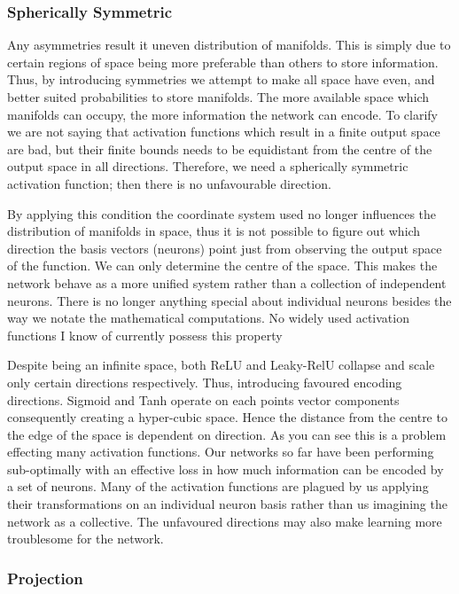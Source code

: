 \documentclass[onecolumn]{article}
\begin{document}
    \subsubsection{Spherically Symmetric}
    
    Any asymmetries result it uneven distribution of manifolds. This is simply due to certain regions of space being more preferable than others to store information. Thus, by introducing symmetries we attempt to make all space have even, and better suited probabilities to store manifolds. The more available space which manifolds can occupy, the more information the network can encode. To clarify we are not saying that activation functions which result in a finite output space are bad, but their finite bounds needs to be equidistant from the centre of the output space in all directions. Therefore, we need a spherically symmetric activation function; then there is no unfavourable direction.

    By applying this condition the coordinate system used no longer influences the distribution of manifolds in space, thus it is not possible to figure out which direction the basis vectors (neurons) point just from observing the output space of the function. We can only determine the centre of the space. This makes the network behave as a more unified system rather than a collection of independent neurons. There is no longer anything special about individual neurons besides the way we notate the mathematical computations. No widely used activation functions I know of currently possess this property
        
    Despite being an infinite space, both ReLU and Leaky-RelU collapse and scale only certain directions respectively. Thus, introducing favoured encoding directions. Sigmoid and Tanh operate on each points vector components consequently creating a hyper-cubic space. Hence the distance from the centre to the edge of the space is dependent on direction. As you can see this is a problem effecting many activation functions. Our networks so far have been performing sub-optimally with an effective loss in how much information can be encoded by a set of neurons. Many of the activation functions are plagued by us applying their transformations on an individual neuron basis rather than us imagining the network as a collective. The unfavoured directions may also make learning more troublesome for the network.

    \subsubsection{Projection}
        
\end{document}
